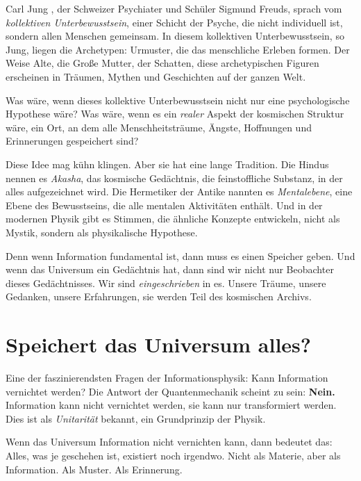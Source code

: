 Carl Jung \cite{Jung1959}, der Schweizer Psychiater und Schüler Sigmund Freuds, sprach vom \emph{kollektiven Unterbewusstsein}, einer Schicht der Psyche, die nicht individuell ist, sondern allen Menschen gemeinsam. In diesem kollektiven Unterbewusstsein, so Jung, liegen die Archetypen: Urmuster, die das menschliche Erleben formen. Der Weise Alte, die Große Mutter, der Schatten, diese archetypischen Figuren erscheinen in Träumen, Mythen und Geschichten auf der ganzen Welt.

Was wäre, wenn dieses kollektive Unterbewusstsein nicht nur eine psychologische Hypothese wäre? Was wäre, wenn es ein \emph{realer} Aspekt der kosmischen Struktur wäre, ein Ort, an dem alle Menschheitsträume, Ängste, Hoffnungen und Erinnerungen gespeichert sind?

Diese Idee mag kühn klingen. Aber sie hat eine lange Tradition. Die Hindus nennen es \emph{Akasha}, das kosmische Gedächtnis, die feinstoffliche Substanz, in der alles aufgezeichnet wird. Die Hermetiker der Antike nannten es \emph{Mentalebene}, eine Ebene des Bewusstseins, die alle mentalen Aktivitäten enthält. Und in der modernen Physik gibt es Stimmen, die ähnliche Konzepte entwickeln, nicht als Mystik, sondern als physikalische Hypothese.

Denn wenn Information fundamental ist, dann muss es einen Speicher geben. Und wenn das Universum ein Gedächtnis hat, dann sind wir nicht nur Beobachter dieses Gedächtnisses. Wir sind \emph{eingeschrieben} in es. Unsere Träume, unsere Gedanken, unsere Erfahrungen, sie werden Teil des kosmischen Archivs.

\section{Speichert das Universum alles?}

Eine der faszinierendsten Fragen der Informationsphysik: Kann Information vernichtet werden? Die Antwort der Quantenmechanik scheint zu sein: \textbf{Nein.} Information kann nicht vernichtet werden, sie kann nur transformiert werden. Dies ist als \emph{Unitarität} bekannt, ein Grundprinzip der Physik.

Wenn das Universum Information nicht vernichten kann, dann bedeutet das: Alles, was je geschehen ist, existiert noch irgendwo. Nicht als Materie, aber als Information. Als Muster. Als Erinnerung.

